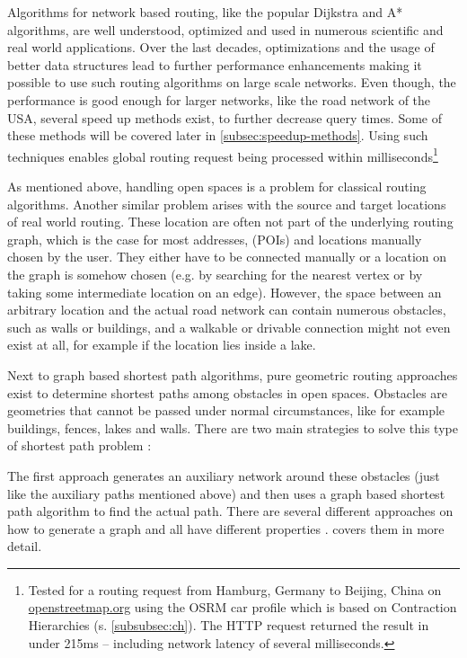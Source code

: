 	Algorithms for network based routing, like the popular Dijkstra and A* algorithms, are well understood, optimized and used in numerous scientific and real world applications.
	Over the last decades, optimizations and the usage of better data structures lead to further performance enhancements making it possible to use such routing algorithms on large scale networks.
	Even though, the performance is good enough for larger networks, like the road network of the USA\cite{aviram-optimizing-dijkstra}, several speed up methods exist, to further decrease query times.
	Some of these methods will be covered later in \cref{subsec:speedup-methods}.
	Using such techniques enables global routing request being processed within milliseconds\footnote{Tested for a routing request from Hamburg, Germany to Beijing, China on \href{https://www.openstreetmap.org/directions?engine=fossgis\_osrm\_car&route=53.55\%2C10.00\%3B39.91\%2C116.39}{openstreetmap.org} using the OSRM car profile which is based on Contraction Hierarchies (s. \cref{subsubsec:ch}). The HTTP request returned the result in under 215ms -- including network latency of several milliseconds.}
	
	As mentioned above, handling open spaces is a problem for classical routing algorithms.
	Another similar problem arises with the source and target locations of real world routing.
	These location are often not part of the underlying routing graph, which is the case for most addresses,  (POIs) and locations manually chosen by the user.
	They either have to be connected manually or a location on the graph is somehow chosen (e.g. by searching for the nearest vertex or by taking some intermediate location on an edge).
	However, the space between an arbitrary location and the actual road network can contain numerous obstacles, such as walls or buildings, and a walkable or drivable connection might not even exist at all, for example if the location lies inside a lake.
	
	Next to graph based shortest path algorithms, pure geometric routing approaches exist to determine shortest paths among obstacles in open spaces.
	Obstacles are geometries that cannot be passed under normal circumstances, like for example buildings, fences, lakes and walls.
	There are two main strategies to solve this type of shortest path problem \cite{hershberger-suri}:
	
	The first approach generates an auxiliary network around these obstacles (just like the auxiliary paths mentioned above) and then uses a graph based shortest path algorithm to find the actual path.
	There are several different approaches on how to generate a graph and all have different properties \cite{graser-osm-open-spaces}.
	 covers them in more detail.
	
